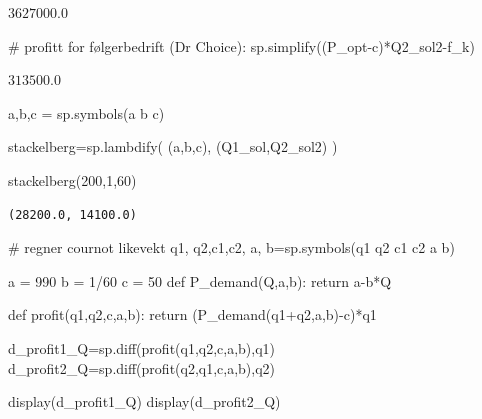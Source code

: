 \documentclass[
  12pt,
  a4paper,
  DIV=11,
  numbers=noendperiod]{scrartcl}
\newenvironment{Shaded}{\begin{snugshade}}{\end{snugshade}}
\newcommand{\CommentTok}[1]{\textcolor[rgb]{0.37,0.37,0.37}{#1}}
\newcommand{\ControlFlowTok}[1]{\textcolor[rgb]{0.00,0.23,0.31}{#1}}
\newcommand{\DecValTok}[1]{\textcolor[rgb]{0.68,0.00,0.00}{#1}}
\newcommand{\KeywordTok}[1]{\textcolor[rgb]{0.00,0.23,0.31}{#1}}
\newcommand{\NormalTok}[1]{\textcolor[rgb]{0.00,0.23,0.31}{#1}}
\newcommand{\OperatorTok}[1]{\textcolor[rgb]{0.37,0.37,0.37}{#1}}
\newcommand{\StringTok}[1]{\textcolor[rgb]{0.13,0.47,0.30}{#1}}
\begin{document}
$\displaystyle 3627000.0$

\begin{Shaded}
\begin{Highlighting}[]
\CommentTok{\# profitt for følgerbedrift (Dr Choice):}
\NormalTok{sp.simplify((P\_opt}\OperatorTok{{-}}\NormalTok{c)}\OperatorTok{*}\NormalTok{Q2\_sol2}\OperatorTok{{-}}\NormalTok{f\_k)}
\end{Highlighting}
\end{Shaded}

$\displaystyle 313500.0$

\begin{Shaded}
\begin{Highlighting}[]
\NormalTok{a,b,c  }\OperatorTok{=}\NormalTok{ sp.symbols(}\StringTok{\textquotesingle{}a b c\textquotesingle{}}\NormalTok{)}

\NormalTok{stackelberg}\OperatorTok{=}\NormalTok{sp.lambdify(}
\NormalTok{    (a,b,c), }
\NormalTok{    (Q1\_sol,Q2\_sol2)}
\NormalTok{)}

\NormalTok{stackelberg(}\DecValTok{200}\NormalTok{,}\DecValTok{1}\NormalTok{,}\DecValTok{60}\NormalTok{)}
\end{Highlighting}
\end{Shaded}

\begin{verbatim}
(28200.0, 14100.0)
\end{verbatim}

\begin{Shaded}
\begin{Highlighting}[]
\CommentTok{\# regner cournot likevekt}
\NormalTok{q1, q2,c1,c2, a, b}\OperatorTok{=}\NormalTok{sp.symbols(}\StringTok{\textquotesingle{}q1 q2 c1 c2 a b\textquotesingle{}}\NormalTok{)}

\NormalTok{a }\OperatorTok{=} \DecValTok{990}
\NormalTok{b }\OperatorTok{=} \DecValTok{1}\OperatorTok{/}\DecValTok{60}
\NormalTok{c }\OperatorTok{=} \DecValTok{50}
\KeywordTok{def}\NormalTok{ P\_demand(Q,a,b):}
    \ControlFlowTok{return}\NormalTok{ a}\OperatorTok{{-}}\NormalTok{b}\OperatorTok{*}\NormalTok{Q}

\KeywordTok{def}\NormalTok{ profit(q1,q2,c,a,b):}
    \ControlFlowTok{return}\NormalTok{ (P\_demand(q1}\OperatorTok{+}\NormalTok{q2,a,b)}\OperatorTok{{-}}\NormalTok{c)}\OperatorTok{*}\NormalTok{q1}
\end{Highlighting}
\end{Shaded}

\begin{Shaded}
\begin{Highlighting}[]
\NormalTok{d\_profit1\_Q}\OperatorTok{=}\NormalTok{sp.diff(profit(q1,q2,c,a,b),q1)}
\NormalTok{d\_profit2\_Q}\OperatorTok{=}\NormalTok{sp.diff(profit(q2,q1,c,a,b),q2)}

\NormalTok{display(d\_profit1\_Q)}
\NormalTok{display(d\_profit2\_Q)}
\end{Highlighting}
\end{Shaded}
\end{document}

